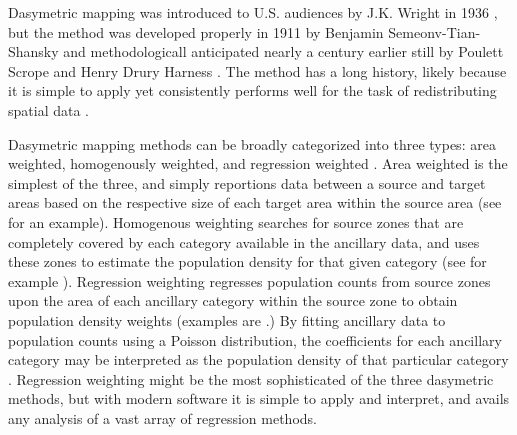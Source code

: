 \documentclass[draft]{article}
\begin{document}

Dasymetric mapping was introduced to U.S. audiences by J.K. Wright in 1936 \cite{wright36}, but the method was developed properly in 1911 by Benjamin Semeonv-Tian-Shansky and methodologicall anticipated nearly a century earlier still by Poulett Scrope and Henry Drury Harness \cite{petrov12}.  The method has a long history, likely because it is simple to apply yet consistently performs well for the task of redistributing spatial data \cite{eicher01, holt11, barrozo16, amos17}.

Dasymetric mapping methods can be broadly categorized into three types: area weighted, homogenously weighted, and regression weighted \cite{reibel07}.  Area weighted is the simplest of the three, and simply reportions data between a source and target areas based on the respective size of each target area within the source area (see \cite{goodchild80} for an example).  Homogenous weighting searches for source zones that are completely covered by each category available in the ancillary data, and uses these zones to estimate the population density for that given category (see for example \cite{eicher01, mennis03}).  Regression weighting regresses population counts from source zones upon the area of each ancillary category within the source zone to obtain population density weights (examples are \cite{flowerdew89, flowerdew92, reibel07}.)  By fitting ancillary data to population counts using a Poisson distribution, the coefficients for each ancillary category may be interpreted as the  population density of that particular category \cite{reibel07}.  Regression weighting might be the most sophisticated of the three dasymetric methods, but with modern software it is simple to apply and interpret, and avails any analysis of a vast array of regression methods.
\end{document}
